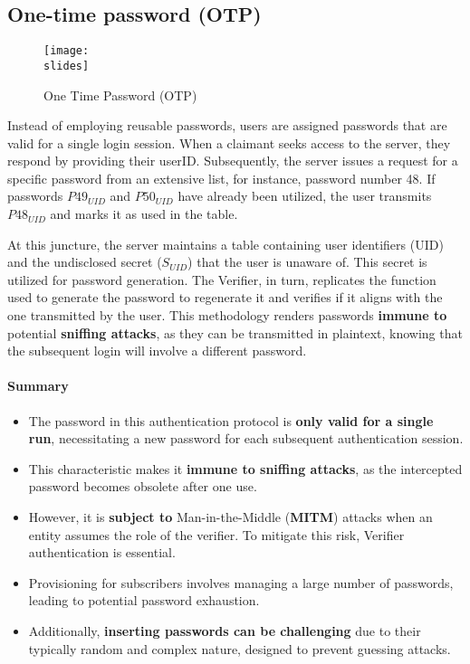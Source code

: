 \subsection{One-time password (OTP)}
\begin{figure}[h]
  \centering
  \texttt{[image: \\slides]}
  \caption{One Time Password (OTP)}
\end{figure}
Instead of employing reusable passwords, users are assigned passwords that are valid for a single login session. When a claimant seeks access to the server, they respond by providing their userID. Subsequently, the server issues a request for a specific password from an extensive list, for instance, password number 48. If passwords $P49_{UID}$ and $P50_{UID}$ have already been utilized, the user transmits $P48_{UID}$ and marks it as used in the table.

At this juncture, the server maintains a table containing user identifiers (UID) and the undisclosed secret ($S_{UID}$) that the user is unaware of.
This secret is utilized for password generation. The Verifier, in turn, replicates the function used to generate the password to regenerate it and verifies if it aligns with the one transmitted by the user. This methodology renders passwords \textbf{immune to} potential \textbf{sniffing attacks}, as they can be transmitted in plaintext, knowing that the subsequent login will involve a different password.

\paragraph{Summary}
\begin{itemize}
  \item The password in this authentication protocol is \textbf{only valid for a single run}, necessitating a new password for each subsequent authentication session.
  \item This characteristic makes it \textbf{immune to sniffing attacks}, as the intercepted password becomes obsolete after one use.
  \item However, it is \textbf{subject to} Man-in-the-Middle (\textbf{MITM}) attacks when an entity assumes the role of the verifier. To mitigate this risk, Verifier authentication is essential.
  \item Provisioning for subscribers involves managing a large number of passwords, leading to potential password exhaustion.
  \item Additionally, \textbf{inserting passwords can be challenging} due to their typically random and complex nature, designed to prevent guessing attacks.
\end{itemize}

